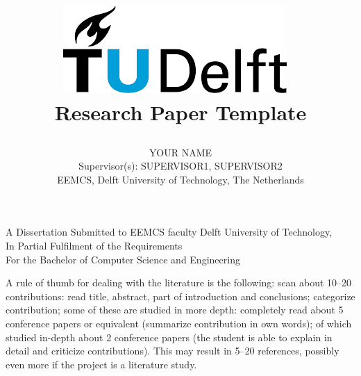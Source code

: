 \documentclass[english]{article}
\begin{document}
\title{

\includegraphics{tudelftlogo.png}~
\\[5cm]
Research Paper Template}

\author{YOUR NAME\\
Supervisor(s): SUPERVISOR1, SUPERVISOR2\\
EEMCS, Delft University of Technology, The Netherlands
}

\maketitle
\vfill
\begin{center}
A Dissertation Submitted to EEMCS faculty Delft University of Technology,\\
In Partial Fulfilment of the Requirements\\
For the Bachelor of Computer Science and Engineering
\end{center}


\newpage























A rule of thumb for dealing with the literature is the following: scan about 10--20 contributions: read title, abstract, part of introduction and conclusions; categorize contribution; some of these are studied in more depth: completely read about 5 conference papers or equivalent (summarize contribution in own words); of which studied in-depth about 2 conference papers (the student is able to explain in detail and criticize contributions). This may result in 5--20 references, possibly even more if the project is a literature study.
\end{document}
